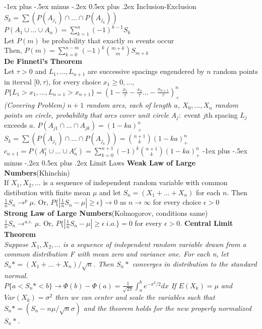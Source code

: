 \documentclass[10pt,landscape]{article}
\makeatletter
\renewcommand{\section}{\@startsection{section}{1}{0mm}%
                                {-1ex plus -.5ex minus -.2ex}%
                                {0.5ex plus .2ex}%
                                {\normalfont\large\bfseries}}
\makeatother
\begin{document}
\begin{multicols*}{3}
\section{Inclusion-Exclusion}
\textit{$S_k= \sum (P(A_{j_1}) \cap...\cap P(A_{j_k}))$}\\
\textit{$P(A_1 \cup ...\cup A_n)=\sum_{k=1}^{n} (-1)^{k-1}S_k$}\\
Let $P(m)$ be probability that exactly $m$ events occur \\
Then, \textit{$P(m)=\sum_{k=0}^{n-m}(-1)^{k}{m+k \choose m}S_{m+k}$}\\ 
\textbf{De Finneti's Theorem}\\
Let $\tau>0$ and $L_1 ,..., L_{n+1}$ are successive spacings engendered by $n$ random points in iterval $[0,\tau)$, for every choice $x_1\geq 0, ...,$
\textit{$P\{L_1>x_1,...,L_{n=1}>x_{n+1}\}=(1-\frac{x_1}{\tau}-\frac{x_2}{\tau}...-\frac{x_{n+1}}{\tau})^n_+$}\\
\textit{(Covering Problem) $n+1$ random arcs, each of length $a$, $X_0,...,X_n$ random points on circle, probability that arcs cover unit circle}
$A_j:$ event $j$th spacing $L_j$ exceeds $a$. \textit{$P(A_{j1} \cap ...\cap A_{jk})=(1-ka)^n_+$}
\textit{$S_k= \sum (P(A_{j_1}) \cap...\cap P(A_{j_k}))={n+1 \choose k} (1-ka)^n_+$}\\
\textit{$c_{n+1}=P(A_{1}^{c} \cup ...\cup A_{n}^{c})=\sum_{k=0}^{n+1}(-1)^{k}{n+1 \choose k}(1-ka)^n_+$ }  
\section{Limit Laws}
\textbf{Weak Law of Large Numbers}(Khinchin)\\
If $X_1,X_2,...$ is a sequence of independent random variable with common distibution with finite mean $\mu$ and let $S_n=(X_1+...+X_n)$ for each $n$. Then $\frac{1}{n} S_n \rightarrow^{p} \mu$. Or, $P\{|\frac{1}{n} S_n - \mu | \geq \epsilon\} \rightarrow 0$ as $n \rightarrow \infty$ for every choice $\epsilon>0$\\
\textbf{Strong Law of Large Numbers}(Kolmogorov, conditions same)\\
$\frac{1}{n} S_n \rightarrow^{a.e.} \mu$. Or,  $P\{|\frac{1}{n} S_n - \mu | \geq \epsilon\ i.o.\}=0$ for every $\epsilon>0$.
\textbf{Central Limit Theorem}\\
\textit{Suppose $X_1,X_2,...$ is a sequence of independent random variable drawn from a common distribution F with mean zero and variance one. For each n, let $S_n*=(X_1+...+X_n)/\sqrt{n}$. Then $S_n*$ converges in distribution to the standard normal.}\\
	$P\{a<S_n*<b\}\rightarrow\Phi(b)-\Phi(a)=\frac{1}{\sqrt{2\pi}}\int_{a}^{b}e^{-x^2/2}dx$
\textit{If $E(X_k)=\mu$ and $Var(X_k)=\sigma^2$ then we can center and scale the variables such that $S_n*=(S_n - n\mu/\sqrt{n}\sigma)$ and the theorem holds for the new properly normalized $S_n*$.}


\end{multicols*}
\end{document}
